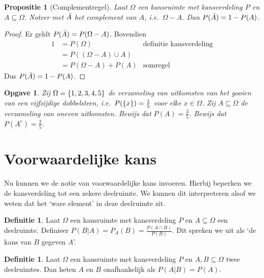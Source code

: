 \documentclass[a4paper]{book}
\newtheorem{proposition}[theorem]{Propositie}
\newtheorem{exercise}[theorem]{Opgave}
\theoremstyle{definition}
\newtheorem{definition}[theorem]{Definitie}
\begin{document}
\begin{proposition}[Complementregel]\label{complementregel}
    Laat $\Omega$ een kansruimte met kansverdeling $P$ en $A \subseteq \Omega$.
    Noteer met $\compl{A}$ het complement van $A$, i.e.\ $\Omega - A$.
    Dan $P(\compl{A}) = 1 - P(A)$.
\end{proposition}
\begin{proof}
    Er geldt $P(\compl{A}) = P(\Omega - A)$.
    Bovendien
    \begin{align*}
        1 &= P(\Omega) & \text{definitie kansverdeling}\\
          &= P( (\Omega - A) \cup A) \\
          &= P(\Omega - A) + P(A) & \text{somregel}
    \end{align*}
    Dus $P(\compl{A}) = 1 - P(A)$.
\end{proof}


\begin{exercise}
    Zij $\Omega = \set{1,2,3,4,5}$ de verzameling van uitkomsten van het gooien van een vijfzijdige dobbelsteen,
    i.e.\ $P(\set{x}) = \frac{1}{5}$ voor elke $x \in \Omega$.
    Zij $A \subseteq \Omega$ de verzameling van oneven uitkomsten.
    Bewijs dat $P(A) = \frac{3}{5}$.
    Bewijs dat $P(A^c) = \frac{2}{5}$.
\end{exercise}


\section{Voorwaardelijke kans}
Nu kunnen we de notie van voorwaardelijke kans invoeren.
Hierbij beperken we de kansverdeling tot een zekere deelruimte.
We kunnen dit interpreteren alsof we weten dat het `ware element' in deze deelruimte zit.
\begin{definition}
    Laat $\Omega$ een kansruimte met kansverdeling $P$ en $A \subseteq \Omega$ een deelruimte.
    Definieer $P(B|A) = P_A(B) = \frac{P(A \cap B)}{P(B)}$. Dit spreken we uit als `de kans van $B$ gegeven $A$'.
\end{definition}

\begin{definition}
    Laat $\Omega$ een kansruimte met kansverdeling $P$ en $A,B \subseteq \Omega$ twee deelruimtes.
    Dan heten $A$ en $B$ onafhankelijk als $P(A|B) = P(A)$.
\end{definition}
\end{document}
